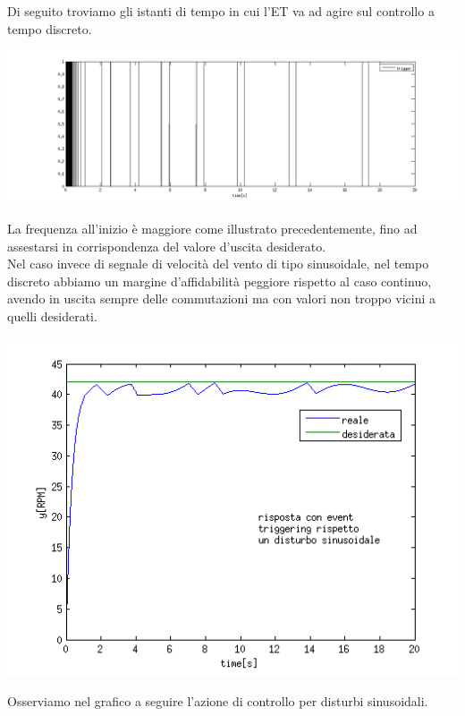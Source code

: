 \documentclass[a4paper,13pt]{article}
\begin{document}
	Di seguito troviamo gli istanti di tempo in cui l'ET va ad agire sul controllo a tempo discreto.\\
\begin{center}
\includegraphics[scale=0.4]{graph/trigger1.png}
\end{center}
	La frequenza all'inizio è maggiore come illustrato precedentemente, fino ad assestarsi in corrispondenza del valore 		d'uscita desiderato.\\
	Nel caso invece di segnale di velocità del vento di tipo sinusoidale, nel tempo discreto abbiamo un margine 				d'affidabilità peggiore rispetto al caso continuo, avendo in uscita sempre delle commutazioni ma con valori non troppo 	vicini a quelli desiderati.
\begin{center}
\includegraphics[scale=0.6]{graph/ydiscsin.png}
\end{center}
	Osserviamo nel grafico a seguire l'azione di controllo per disturbi sinusoidali.
\end{document}

